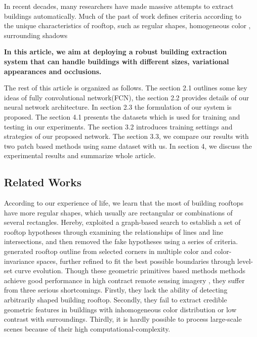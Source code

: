 \documentclass[runningheads]{llncs}
\begin{document}
   In recent decades, many researchers have made massive attempts to extract buildings automatically. Much of the past of work defines criteria according to the unique  characteristics of rooftop, such as regular shapes\cite{noronha2001detection}\cite{nosrati2009novel}\cite{izadi2012three}\cite{wang2015efficient}, homogeneous color \cite{cote2013automatic}, surrounding shadows \cite{ok2013automated} 
   
    \textbf{  In this article, we aim at deploying a robust building extraction system that can handle buildings with different sizes, variational appearances and occlusions.  }
 
   The rest of this article is organized as follows. The section 2.1 outlines some key ideas of fully convolutional network(FCN), the section 2.2 provides details of our neural network architecture. In section 2.3 the formulation of our system is proposed. The section 4.1 presents the datasets which is used for training and testing in our experiments. The section 3.2  introduces training settings and strategies of our proposed network.  The section 3.3, we compare our results with two patch based methods using same dataset with us. In section 4, we discuss the experimental results and summarize whole article. 
   
   
\subsection{Related Works}
	 According to our experience of life, we learn that the most of building rooftops have more regular shapes, which usually are rectangular or combinations of several rectangles. Hereby, \cite{noronha2001detection}\cite{nosrati2009novel}\cite{izadi2012three}\cite{wang2015efficient} exploited a graph-based search to establish a set of rooftop hypotheses through examining the relationships of lines and line intersections, and then removed the fake hypotheses using a series of criteria. \cite{cote2013automatic} generated rooftop outline from selected corners in  multiple color and color-invariance spaces, further refined to fit the best possible boundaries through level-set curve evolution. Though these geometric primitives based methods methods achieve good performance in high contract remote sensing imagery , they suffer from three serious shortcomings. Firstly, they lack the ability of detecting arbitrarily shaped building rooftop. Secondly, they fail to  extract credible geometric features in buildings with inhomogeneous color distribution or low contrast with surroundings. Thirdly, it is hardly possible to process large-scale scenes because of their high computational-complexity.	
	
\end{document}

